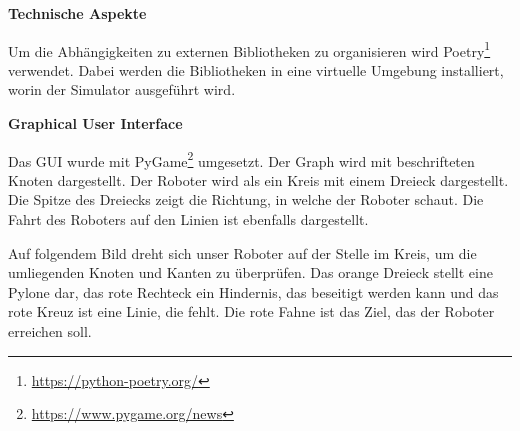 \textbf{Technische Aspekte}

Um die Abhängigkeiten zu externen Bibliotheken zu organisieren wird Poetry\footnote{\url{https://python-poetry.org/}} verwendet. Dabei werden die Bibliotheken in eine virtuelle Umgebung installiert, worin der Simulator ausgeführt wird.

\textbf{Graphical User Interface}

Das GUI wurde mit PyGame\footnote{\url{https://www.pygame.org/news}} umgesetzt. Der Graph wird mit beschrifteten Knoten dargestellt. Der Roboter wird als ein Kreis mit einem Dreieck dargestellt. Die Spitze des Dreiecks zeigt die Richtung, in welche der Roboter schaut.
Die Fahrt des Roboters auf den Linien ist ebenfalls dargestellt.

Auf folgendem Bild dreht sich unser Roboter auf der Stelle im Kreis, um die umliegenden Knoten und Kanten zu überprüfen.
Das orange Dreieck stellt eine Pylone dar, das rote Rechteck ein Hindernis, das beseitigt werden kann und das rote Kreuz ist eine Linie, die fehlt. Die rote Fahne ist das Ziel, das der Roboter erreichen soll.

